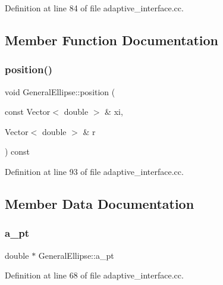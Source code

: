Definition at line 84 of file adaptive\+\_\+interface.\+cc.



\subsection{Member Function Documentation}
\mbox{\label{classGeneralEllipse_a85e975c70441a9c9c711b5e27d124bff}} 
\subsubsection{\texorpdfstring{position()}{position()}}
{\footnotesize\ttfamily void General\+Ellipse\+::position (\begin{DoxyParamCaption}\item[{const Vector$<$ double $>$ \&}]{xi,  }\item[{Vector$<$ double $>$ \&}]{r }\end{DoxyParamCaption}) const\hspace{0.3cm}{\ttfamily [inline]}}



Definition at line 93 of file adaptive\+\_\+interface.\+cc.



\subsection{Member Data Documentation}
\mbox{\label{classGeneralEllipse_ab7accdeac49aacf9f6a1b2fc935e9692}} 
\subsubsection{\texorpdfstring{a\+\_\+pt}{a\_pt}}
{\footnotesize\ttfamily double $\ast$ General\+Ellipse\+::a\+\_\+pt\hspace{0.3cm}{\ttfamily [private]}}



Definition at line 68 of file adaptive\+\_\+interface.\+cc.

\mbox{\label{classGeneralEllipse_ae9fda2830674311985eaf2fddeeec1e3}} 
